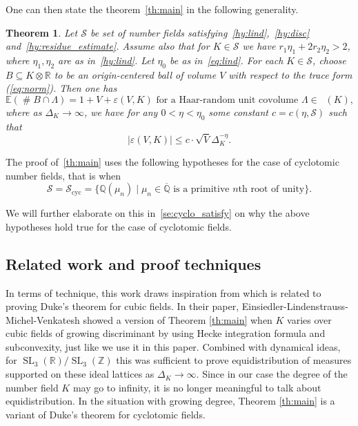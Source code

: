 \documentclass[a4paper]{article}
\newtheorem{theorem}{Theorem}
\theoremstyle{definition}
\theoremstyle{remark}
\DeclareMathOperator{\SL}{SL}
\DeclareMathOperator{\card}{\#}
\DeclareMathOperator{\Ar}{\widetilde{Cl}}
\begin{document}
One can then state the theorem~\cref{th:main} in the following generality.
\begin{theorem}
\label{th:general}
Let $\mathcal{S}$ be set of number fields satisfying~\cref{hy:lind},~\ref{hy:disc} and~\ref{hy:residue_estimate}. Assume also that for $K \in \mathcal{S}$ we have $r_{1} \eta_{1} + 2r_{2} \eta_{2} > 2$, where $\eta_{1},\eta_{2}$ are as in~\cref{hy:lind}.
Let $\eta_{0}$ be as in~\cref{eq:lind}.
For each $K \in \mathcal{S}$, choose $B \subseteq K \otimes \mathbb{R}$ to be an origin-centered ball of volume $V$ with respect to the trace form (\ref{eq:norm}). Then one has
\begin{equation}
\mathbb{E}(\card B \cap \Lambda) = 1 + V + \varepsilon(V,K)
\text{ for a Haar-random unit covolume }\Lambda \in \Ar(K),
\end{equation}
where as $\Delta_K \rightarrow \infty$, 
we have for any $0 < \eta <  \eta_{0}$ 
some constant $c = c(\eta, \mathcal{S})$ such that
\begin{equation}
|\varepsilon(V,K)| \leq c \cdot  \sqrt{V}  \Delta_K^{{-\eta}} .
\end{equation}

\end{theorem}

The proof of~\cref{th:main} uses the following hypotheses for the case of cyclotomic number fields, that is when
\begin{equation}
    \mathcal{S}=  \mathcal{S}_{\mathrm{cyc}} = \{ \mathbb{Q}(\mu_{n}) \mid \mu_{n} \in \overline{\mathbb{Q}} \text{ is a primitive } n\text{th root of unity}\}.
\end{equation}

We will further elaborate on this in~\cref{se:cyclo_satisfy} on why the above hypotheses hold true for the case of cyclotomic fields.


\subsection*{Related work and proof techniques}

In terms of technique, this work draws inspiration from \cite[Proposition 12.5]{ELMV11} which is related to proving Duke's theorem for cubic fields. In their paper, Einsiedler-Lindenstrauss-Michel-Venkatesh showed {a version of} Theorem \ref{th:main} when $K$ varies over cubic fields of growing discriminant by using Hecke integration formula and subconvexity, just like we use it in this paper. 
Combined with dynamical ideas, for $\SL_3(\mathbb{R})/\SL_3(\mathbb{Z})$ this was sufficient to prove equidistribution of measures supported on these ideal lattices as $\Delta_K \rightarrow \infty$. 
Since in our case the degree of the number field $K$ may go to infinity, it is no longer meaningful to talk about equidistribution. 
In the situation with growing degree, Theorem \ref{th:main} is a variant of Duke's theorem for cyclotomic fields.
\end{document}
